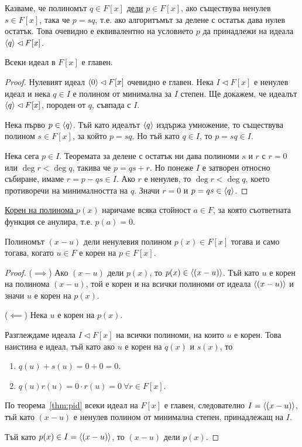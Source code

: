 \documentclass[numbers=endperiod, DIV=15, bibliography=totocnumbered]{scrartcl}
\begin{document}
\begin{definition}
  Казваме, че полиномът $q \in F[x]$ \uline{дели} $p \in F[x]$, ако съществува ненулев $s \in F[x]$, така че $p = sq$, т.е. ако алгоритъмът за делене с остатък дава нулев остатък. Това очевидно е еквивалентно на условието $p$ да принадлежи на идеала $\left\langle q \right\rangle \lhd F[x]$.
\end{definition}

\begin{theorem}\label{thm:pid}
  Всеки идеал в $F[x]$ е главен.
\end{theorem}
\begin{proof}
  Нулевият идеал $\left\langle 0 \right\rangle \lhd F[x]$ очевидно е главен. Нека $I \lhd F[x]$ е ненулев идеал и нека $q \in I$ е полином от минимална за $I$ степен. Ще докажем, че идеалът $\left\langle q \right\rangle \lhd F[x]$, породен от $q$, съвпада с $I$.

  Нека първо $p \in \left\langle q \right\rangle$. Тъй като идеалът $\left\langle q \right\rangle$ издържа умножение, то съществува полином $s \in F[x]$, за който $p = sq$. Но тъй като $q \in I$, то $p = sq \in I$.

  Нека сега $p \in I$. Теоремата за делене с остатък ни дава полиноми $s$ и $r$ с $r = 0$ или $\deg r < \deg q$, такива че $p = qs + r$. Но понеже $I$ е затворен относно събиране, имаме $r = p - qs \in I$. Ако $r$ е ненулев, то $\deg r < \deg q$, което противоречи на минималността на $q$. Значи $r = 0$ и $p = qs \in \left\langle q \right\rangle$.
\end{proof}

\begin{definition}
  \uline{Корен на полинома $p(x)$} наричаме всяка стойност $a \in F$, за която съответната функция се анулира, т.е. $p(a) = 0$.
\end{definition}

\begin{proposition}\label{thm:div-iff-root}
  Полиномът $(x - u)$ дели ненулевия полином $p(x) \in F[x]$ тогава и само тогава, когато $u \in F$ е корен на $p \in F[x]$.
\end{proposition}
\begin{proof}
  ($\implies$) Ако $(x - u)$ дели $p(x)$, то $p(x) \in \left\langle (x - u) \right\rangle$. Тъй като $u$ е корен на полинома $(x - u)$, той е корен и на всички полиноми от идеала $\left\langle (x - u) \right\rangle$ и значи $u$ е корен на $p(x)$.

  ($\impliedby$) Нека $u$ е корен на $p(x)$.

  Разглеждаме идеала $I \lhd F[x]$ на всички полиноми, на които $u$ е корен. Това наистина е идеал, тъй като ако $u$ е корен на $q(x)$ и $s(x)$, то
  \begin{enumerate}
    \item $q(u) + s(u) = 0 + 0 = 0$.
    \item $q(u) r(u) = 0 \cdot r(u) = 0~\forall r \in F[x]$.
  \end{enumerate}

  По теорема~\ref{thm:pid} всеки идеал на $F[x]$ е главен, следователно $I = \left\langle (x - u) \right\rangle$, тъй като $(x - u)$ е ненулев полином от минимална степен, принадлежащ на $I$.

  Тъй като $p(x) \in I = \left\langle (x - u) \right\rangle$, то $(x - u)$ дели $p(x)$.
\end{proof}
\end{document}
